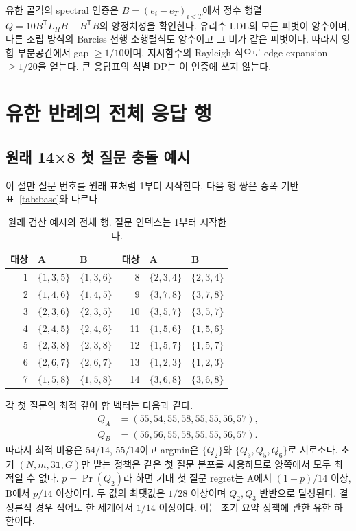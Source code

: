 \documentclass[11pt,a4paper]{article}
\theoremstyle{definition}
\theoremstyle{remark}\newtheorem{remark}[theorem]{주석}
\begin{document}
유한 골격의 spectral 인증은 $B=(e_i-e_T)_{i<T}$에서 정수 행렬 $Q=10B^{\mathsf T}L_HB-B^{\mathsf T}B$의 양정치성을 확인한다. 유리수 LDL의 모든 피벗이 양수이며, 다른 조립 방식의 Bareiss 선행 소행렬식도 양수이고 그 비가 같은 피벗이다. 따라서 영합 부분공간에서 gap $\ge1/10$이며, 지시함수의 Rayleigh 식으로 edge expansion $\ge1/20$을 얻는다. 큰 응답표의 식별 DP는 이 인증에 쓰지 않는다.

\section{유한 반례의 전체 응답 행}\label{app:witnesses}
\subsection{원래 14×8 첫 질문 충돌 예시}
이 절만 질문 번호를 원래 표처럼 1부터 시작한다. 다음 행 쌍은 증폭 기반 표~\ref{tab:base}와 다르다.
\begin{table}[htbp]
\centering\small
\caption{원래 검산 예시의 전체 행. 질문 인덱스는 1부터 시작한다.}\label{tab:original}
\begin{tabular}{rllrll}\toprule
대상 & A & B & 대상 & A & B\\\midrule
1 & $\{1,3,5\}$ & $\{1,3,6\}$ & 8 & $\{2,3,4\}$ & $\{2,3,4\}$\\
2 & $\{1,4,6\}$ & $\{1,4,5\}$ & 9 & $\{3,7,8\}$ & $\{3,7,8\}$\\
3 & $\{2,3,6\}$ & $\{2,3,5\}$ & 10 & $\{3,5,7\}$ & $\{3,5,7\}$\\
4 & $\{2,4,5\}$ & $\{2,4,6\}$ & 11 & $\{1,5,6\}$ & $\{1,5,6\}$\\
5 & $\{2,3,8\}$ & $\{2,3,8\}$ & 12 & $\{1,5,7\}$ & $\{1,5,7\}$\\
6 & $\{2,6,7\}$ & $\{2,6,7\}$ & 13 & $\{1,2,3\}$ & $\{1,2,3\}$\\
7 & $\{1,5,8\}$ & $\{1,5,8\}$ & 14 & $\{3,6,8\}$ & $\{3,6,8\}$\\
\bottomrule\end{tabular}

\end{table}

각 첫 질문의 최적 깊이 합 벡터는 다음과 같다.
\[
\begin{aligned}
 Q_A&=(55,54,55,58,55,55,56,57),\\
 Q_B&=(56,56,55,58,55,55,56,57).
\end{aligned}
\]
따라서 최적 비용은 $54/14$, $55/14$이고 argmin은 $\{Q_2\}$와 $\{Q_3,Q_5,Q_6\}$로 서로소다. 초기 $(N,m,3\mathbf1,G)$만 받는 정책은 같은 첫 질문 분포를 사용하므로 양쪽에서 모두 최적일 수 없다. $p=\Pr(Q_2)$라 하면 기대 첫 질문 regret는 A에서 $(1-p)/14$ 이상, B에서 $p/14$ 이상이다. 두 값의 최댓값은 $1/28$ 이상이며 $Q_2,Q_3$ 반반으로 달성된다. 결정론적 경우 적어도 한 세계에서 $1/14$ 이상이다. 이는 초기 요약 정책에 관한 유한 하한이다.
\end{document}
